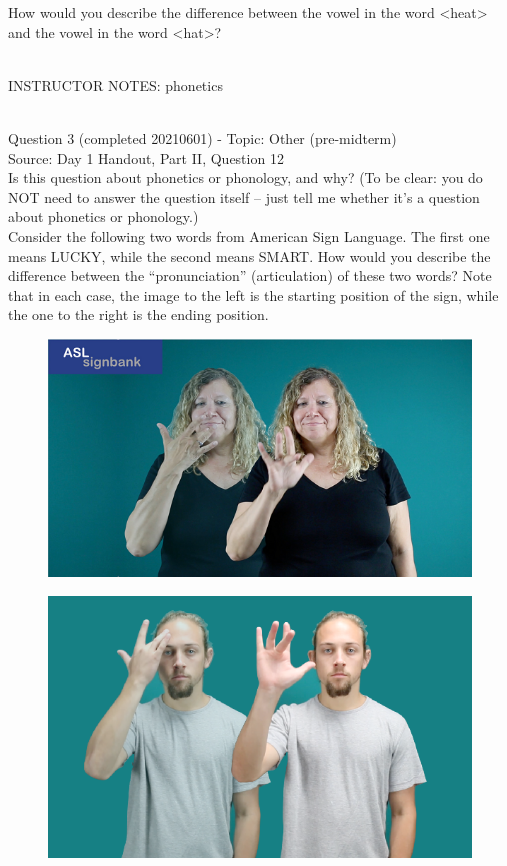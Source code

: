 \documentclass[12pt]{article}
\begin{document}
How would you describe the difference between the vowel in the word <heat> and the vowel in the word <hat>?


~\\
INSTRUCTOR NOTES: phonetics


~\\

{\large Question 3} (completed 20210601) - Topic: Other (pre-midterm)\\
Source: Day 1 Handout, Part II, Question 12\\

Is this question about phonetics or phonology, and why? (To be clear: you do NOT need to answer the question itself -- just tell me whether it's a question about phonetics or phonology.)\\

Consider the following two words from American Sign Language. The first one means LUCKY, while the second means SMART. How would you describe the difference between the ``pronunciation'' (articulation) of these two words? Note that in each case, the image to the left is the starting position of the sign, while the one to the right is the ending position.

\begin{figure}[H]
\includegraphics{../images/asl_lucky.png}
\end{figure}
\begin{figure}[H]
\includegraphics{../images/asl_smart.png}
\end{figure}
\end{document}
